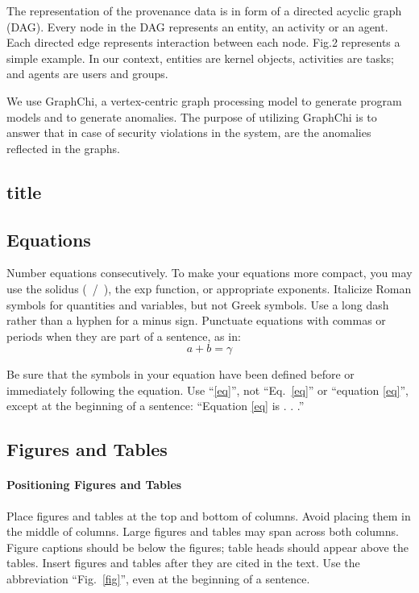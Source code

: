 \documentclass{IEEEtran}
\begin{document}
The representation of the provenance data is in form of a directed acyclic graph (DAG). Every node in the DAG represents an entity, an activity or an agent. Each directed edge represents interaction between each node. Fig.2 represents a simple example. In our context, entities are kernel objects, activities are tasks; and agents are users and groups. 

We use GraphChi, a vertex-centric graph processing model to generate program models and to generate anomalies. The purpose of utilizing GraphChi is to answer that in case of security violations in the system, are the anomalies reflected in the graphs. 


\subsection{title}
\subsection{Equations}
Number equations consecutively. To make your 
equations more compact, you may use the solidus (~/~), the exp function, or 
appropriate exponents. Italicize Roman symbols for quantities and variables, 
but not Greek symbols. Use a long dash rather than a hyphen for a minus 
sign. Punctuate equations with commas or periods when they are part of a 
sentence, as in:
\begin{equation}
a+b=\gamma\label{eq}
\end{equation}

Be sure that the 
symbols in your equation have been defined before or immediately following 
the equation. Use ``\eqref{eq}'', not ``Eq.~\eqref{eq}'' or ``equation \eqref{eq}'', except at 
the beginning of a sentence: ``Equation \eqref{eq} is . . .''







\subsection{Figures and Tables}
\paragraph{Positioning Figures and Tables} Place figures and tables at the top and 
bottom of columns. Avoid placing them in the middle of columns. Large 
figures and tables may span across both columns. Figure captions should be 
below the figures; table heads should appear above the tables. Insert 
figures and tables after they are cited in the text. Use the abbreviation 
``Fig.~\ref{fig}'', even at the beginning of a sentence.
\end{document}
